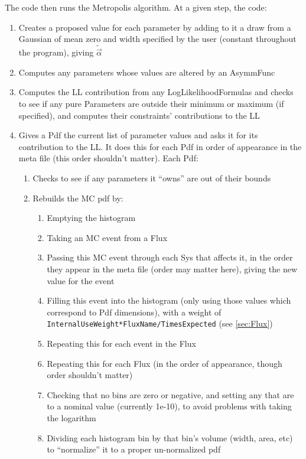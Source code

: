 The code then runs the Metropolis algorithm.  At a given step, the code:
\begin{enumerate}
\item Creates a proposed value for each parameter by adding to it a draw
  from a Gaussian of mean zero and width specified by the user
  (constant throughout the program), giving $\tilde{\vec{\alpha}}$
\item Computes any parameters whose values are altered by an AsymmFunc
\item Computes the LL contribution from any LogLikelihoodFormulas and
  checks to see if any pure Parameters are outside their minimum or
  maximum (if specified), and computes their constraints' contributions
  to the LL
\item Gives a Pdf the current list of parameter values and asks it for
  its contribution to the LL.  It does this for each Pdf in order of
  appearance in the meta file (this order shouldn't matter).  Each
  Pdf:
  \begin{enumerate}
  \item Checks to see if any parameters it ``owns'' are out of their bounds
  \item Rebuilds the MC pdf by:
    \begin{enumerate}
    \item Emptying the histogram
    \item Taking an MC event from a Flux
    \item Passing this MC event through each Sys that affects it, in
      the order they appear in the meta file (order may matter here),
      giving the new value for the event
    \item Filling this event into the histogram (only using those
      values which correspond to Pdf dimensions), with a weight of\\
      {\tt InternalUseWeight*FluxName/TimesExpected} (see \ref{sec:Flux})
    \item Repeating this for each event in the Flux
    \item Repeating this for each Flux (in the order of appearance,
      though order shouldn't matter)
    \item Checking that no bins are zero or negative, and setting any
      that are to a nominal value (currently 1e-10), to avoid problems
      with taking the logarithm
    \item Dividing each histogram bin by that bin's volume (width,
    area, etc) to ``normalize'' it to a proper un-normalized pdf
    \end{enumerate}

\end{enumerate}
\end{enumerate}
